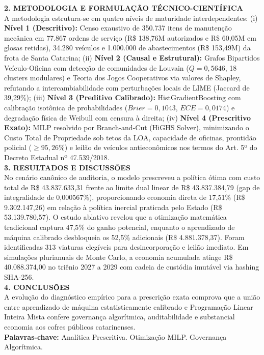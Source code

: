 \documentclass[12pt,a4paper]{article}
\begin{document}
\noindent \textbf{2. METODOLOGIA E FORMULAÇÃO TÉCNICO-CIENTÍFICA}\\
A metodologia estrutura-se em quatro níveis de maturidade interdependentes: (i) \textbf{Nível 1 (Descritivo):} Censo exaustivo de 350.737 itens de manutenção mecânica em 77.867 ordens de serviço (R\$ 138,76M autorizados e R\$ 60,05M em glosas retidas), 34.280 veículos e 1.000.000 de abastecimentos (R\$ 153,49M) da frota de Santa Catarina; (ii) \textbf{Nível 2 (Causal e Estrutural):} Grafos Bipartidos Veículo-Oficina com detecção de comunidades de Louvain ($Q = 0,5646$, 18 clusters modulares) e Teoria dos Jogos Cooperativos via valores de Shapley, refutando a intercambiabilidade com perturbações locais de LIME (Jaccard de 39,29\%); (iii) \textbf{Nível 3 (Preditivo Calibrado):} HistGradientBoosting com calibração isotônica de probabilidades ($Brier = 0,1043$, $ECE = 0,0174$) e degradação física de Weibull com censura à direita; (iv) \textbf{Nível 4 (Prescritivo Exato):} MILP resolvido por Branch-and-Cut (HiGHS Solver), minimizando o Custo Total de Propriedade sob tetos da LOA, capacidade de oficinas, prontidão policial ($\ge 95,26\%$) e leilão de veículos antieconômicos nos termos do Art. 5º do Decreto Estadual nº 47.539/2018.\\

\noindent \textbf{3. RESULTADOS E DISCUSSÕES}\\
No cenário canônico de auditoria, o modelo prescreveu a política ótima com custo total de R\$ 43.837.633,31 frente ao limite dual linear de R\$ 43.837.384,79 (gap de integralidade de 0,000567\%), proporcionando economia direta de 17,51\% (R\$ 9.302.147,26) em relação à política inercial praticada pelo Estado (R\$ 53.139.780,57). O estudo ablativo revelou que a otimização matemática tradicional captura 47,5\% do ganho potencial, enquanto o aprendizado de máquina calibrado desbloqueia os 52,5\% adicionais (R\$ 4.881.378,37). Foram identificadas 313 viaturas elegíveis para desincorporação e leilão imediato. Em simulações plurianuais de Monte Carlo, a economia acumulada atinge R\$ 40.088.374,00 no triênio 2027 a 2029 com cadeia de custódia imutável via hashing SHA-256.\\

\noindent \textbf{4. CONCLUSÕES}\\
A evolução do diagnóstico empírico para a prescrição exata comprova que a união entre aprendizado de máquina estatisticamente calibrado e Programação Linear Inteira Mista confere governança algorítmica, auditabilidade e substancial economia aos cofres públicos catarinenses.\\[0.5cm]

\noindent \textbf{Palavras-chave:} Analítica Prescritiva. Otimização MILP. Governança Algorítmica.
\end{document}
